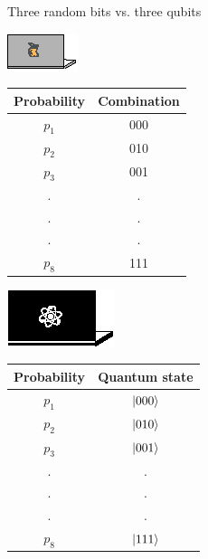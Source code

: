 \documentclass[10pt]{beamer}
\begin{document}
{
\begin{frame}[fragile]{Three random bits vs. three qubits}

\begin{minipage}[c]{0.49\textwidth}
\centering
\includegraphics[scale=1.9]{Vectors/laptop_c.eps}\\
\vspace{0.4cm}
\begin{tabular}{c | c}
	Probability & Combination \\
	\midrule
	$p_1$ & 000 \\
	$p_2$ & 010 \\
	$p_3$ & 001 \\
	. & .\\
	. & . \\
	. & . \\
	$p_8$ & 111 \\
	
\end{tabular}
\end{minipage}%
\begin{minipage}[c]{0.49\textwidth}
\centering
\includegraphics[scale=1.2]{Vectors/laptop_q.eps}\\
\vspace{0.5cm}
\begin{tabular}{c | c}
	Probability & Quantum state \\
	\midrule
	$p_1$ & $\ket{000}$ \\
	$p_2$ & $\ket{010}$ \\
	$p_3$ & $\ket{001}$ \\
	. & . \\
	. & . \\
	. & . \\
	$p_8$ & $\ket{111}$ \\
	
\end{tabular}
\end{minipage}

\end{frame}
}
\end{document}
